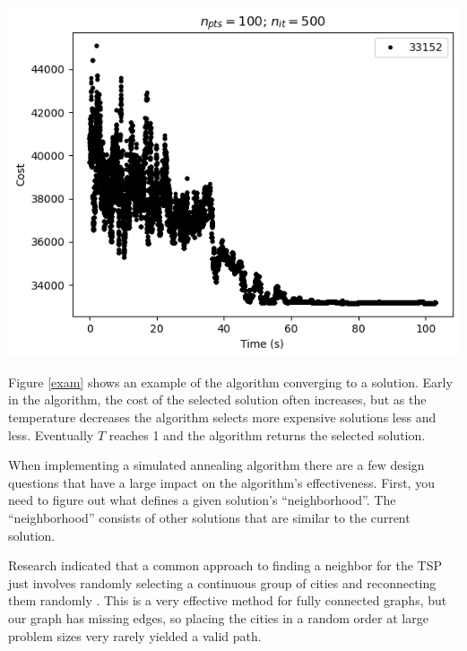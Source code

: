 \documentclass{article}
\begin{document}
\begin{multicols}{2}
        \begin{center}
            \begin{minipage}{0.9\columnwidth}
                \includegraphics[width=\columnwidth]{./sVal100/Annealing_100Pts_500it.png}
                \label{exam}
            \end{minipage}
        \end{center}
        
        Figure \ref{exam} shows an example of the algorithm converging to a solution. Early in the algorithm, the cost of the selected solution often increases, but as the temperature decreases the algorithm selects more expensive solutions less and less. Eventually $T$ reaches 1 and the algorithm returns the selected solution.

        When implementing a simulated annealing algorithm there are a few design questions that have a large impact on the algorithm's effectiveness. First, you need to figure out what defines a given solution's ``neighborhood''. The ``neighborhood'' consists of other solutions that are similar to the current solution. 
        
        Research indicated that a common approach to finding a neighbor for the TSP just involves randomly selecting a continuous group of cities and reconnecting them randomly \cite{tspWeb}. This is a very effective method for fully connected graphs, but our graph has missing edges, so placing the cities in a random order at large problem sizes very rarely yielded a valid path. 
        

\end{multicols}
\end{document}
